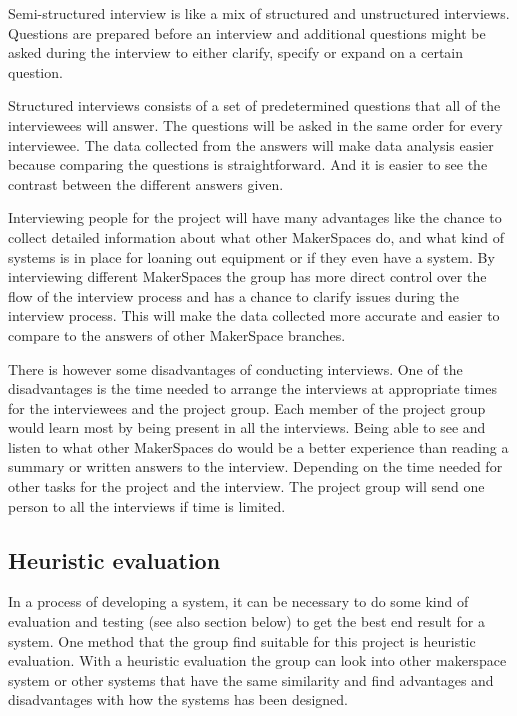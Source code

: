 Semi-structured interview is like a mix of structured and unstructured interviews. Questions are prepared before an interview and additional questions might be asked during the interview to either clarify, specify or expand on a certain question. 

Structured interviews consists of a set of predetermined questions that all of the interviewees will answer. The questions will be asked in the same order for every interviewee. The data collected from the answers will make data analysis easier because comparing the questions is straightforward. And it is easier to see the contrast between the different answers given.

Interviewing people for the project will have many advantages like the chance to collect detailed information about what other MakerSpaces do, and what kind of systems is in place for loaning out equipment or if they even have a system. By interviewing different MakerSpaces the group has more direct control over the flow of the interview process and has a chance to clarify issues during the interview process. This will make the data collected more accurate and easier to compare to the answers of other MakerSpace branches.

There is however some disadvantages of conducting interviews. One of the disadvantages is the time needed to arrange the interviews at appropriate times for the interviewees and the project group. Each member of the project group would learn most by being present in all the interviews. Being able to see and listen to what other MakerSpaces do would be a better experience than reading a summary or written answers to the interview. Depending on the time needed for other tasks for the project and the interview. The project group will send one person to all the interviews if time is limited.
 
\subsection{Heuristic evaluation}
In a process of developing a system, it can be necessary to do some kind of evaluation and testing\cite{heuristic-evaluation} (see also section below) to get the best end result for a system. One method that the group find suitable for this project is heuristic evaluation. With a heuristic evaluation the group can look into other makerspace system or other systems that have the same similarity and find advantages and disadvantages with how the systems has been designed.

